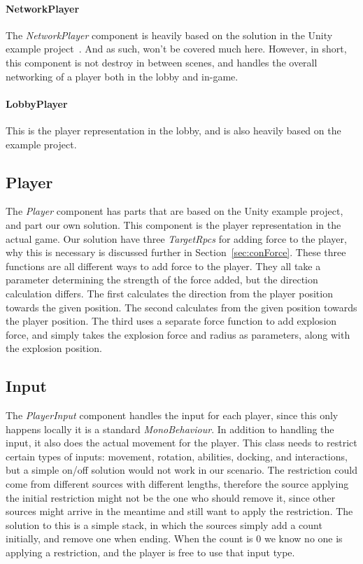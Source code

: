 \paragraph{NetworkPlayer}
The \emph{NetworkPlayer} component is heavily based on the solution in the Unity example project~\cite{unityTanksProject}. And as such, won't be covered much here. However, in short, this component is not destroy in between scenes, and handles the overall networking of a player both in the lobby and in-game.
\paragraph{LobbyPlayer}
This is the player representation in the lobby, and is also heavily based on the example project.

\subsection{Player}
The \emph{Player} component has parts that are based on the Unity example project, and part our own solution. This component is the player representation in the actual game. Our solution have three \emph{TargetRpcs} for adding force to the player, why this is necessary is discussed further in Section~\ref{sec:conForce}. These three functions are all different ways to add force to the player. They all take a parameter determining the strength of the force added, but the direction calculation differs. The first calculates the direction from the player position towards the given position. The second calculates from the given position towards the player position. The third uses a separate force function to add explosion force, and simply takes the explosion force and radius as parameters, along with the explosion position.
    
\subsection{Input}
The \emph{PlayerInput} component handles the input for each player, since this only happens locally it is a standard \emph{MonoBehaviour}. In addition to handling the input, it also does the actual movement for the player. This class needs to restrict certain types of inputs: movement, rotation, abilities, docking, and interactions, but a simple on/off solution would not work in our scenario. The restriction could come from different sources with different lengths, therefore the source applying the initial restriction might not be the one who should remove it, since other sources might arrive in the meantime and still want to apply the restriction. The solution to this is a simple stack, in which the sources simply add a count initially, and remove one when ending. When the count is 0 we know no one is applying a restriction, and the player is free to use that input type.

